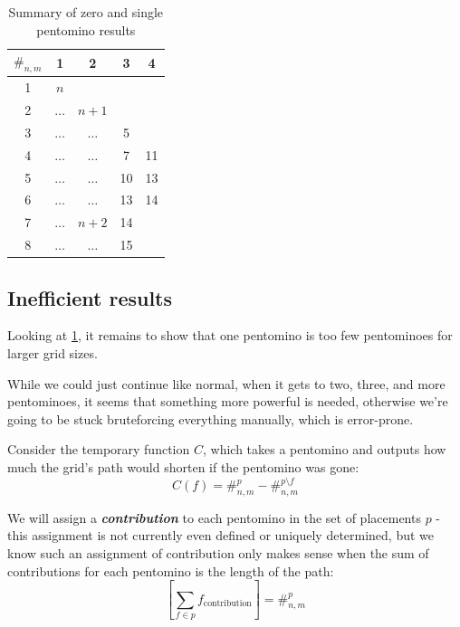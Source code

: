 \documentclass{article}
\theoremstyle{definition}%
\newcommand{\newterm}[1]{\textbf{\textit{#1}}}
\begin{document}
\begin{table}[b]
    \centering
    \begin{tabular}{ccccc}
        \toprule
        $\#_{n,m}$ & 1 & 2 & 3 & 4 \\
        \midrule
        1 & $n$ & & & \\
        2 & $\dots$ & $n+1$ & & \\
        3 & $\dots$ & $\dots$ & 5 & \\
        4 & $\dots$ & $\dots$ & 7 & 11 \\
        5 & $\dots$ & $\dots$ & 10 & 13 \\
        6 & $\dots$ & $\dots$ & 13 & 14 \\
        7 & $\dots$ & $n+2$ & 14 & \\
        8 & $\dots$ & $\dots$ & 15 & \\
        \bottomrule
    \end{tabular}
    \caption{Summary of zero and single pentomino results}
    \label{tab:single pentomino results}
\end{table}

\clearpage
\subsection{Inefficient results}

Looking at \cref{tab:single pentomino results}, it remains to show that one pentomino is too few pentominoes for larger grid sizes.

While we could just continue like normal, when it gets to two, three, and more pentominoes,
it seems that something more powerful is needed, otherwise we're going to be stuck
bruteforcing everything manually, which is error-prone.

Consider the temporary function $C$, which takes a pentomino and outputs how much the grid's path would shorten if the pentomino was gone:
\[
C(f) = \#^p_{n,m} - \#^{p \setminus {f}}_{n,m}
\]

We will assign a \newterm{contribution} to each pentomino in the set of placements $p$ - this assignment is not currently even defined or uniquely determined, but we know such an assignment of contribution only makes sense when the sum of contributions for each pentomino is the length of the path:
\[
\left[ \sum_{f \in p} f_{\mathrm{contribution}} \right] = \#^p_{n,m}
\]
\end{document}
